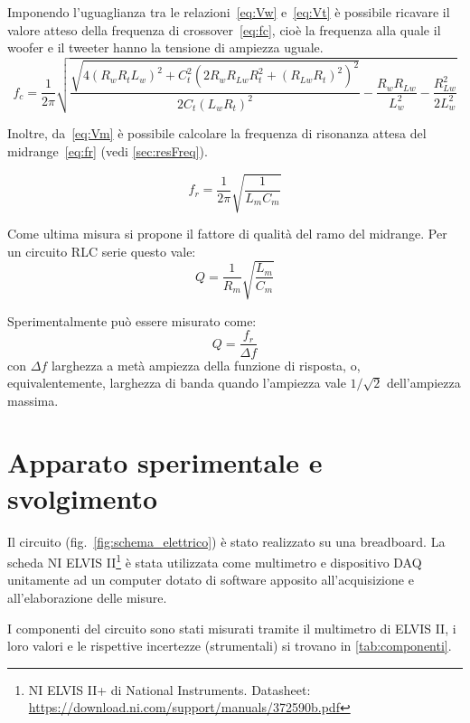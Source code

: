 \documentclass[12pt,italian]{article}
\begin{document}
Imponendo l'uguaglianza tra le relazioni~\eqref{eq:Vw} e~\eqref{eq:Vt} è
possibile ricavare il valore atteso della frequenza di crossover~\eqref{eq:fc},
cioè la frequenza alla quale il woofer e il tweeter hanno la tensione di
ampiezza uguale.
\begin{equation}
	\label{eq:fc}
	f_{c} = \frac{1}{2\pi}\sqrt{\frac{\sqrt{4 {(R_{w} R_{t} L_{w})}^2 + C_{t}^2{(2
	R_{w} R_{Lw} R_{t}^2 + {(R_{Lw} R_{t})}^2)}^2}}{2 C _{t} {(L_{w} R_{t})}^2 } -
	\frac{R_{w} R_{Lw}}{L_{w}^2} - \frac{R_{Lw}^2}{2 L_{w}^2}}
\end{equation}

Inoltre, da~\eqref{eq:Vm} è possibile calcolare la frequenza di risonanza
attesa del midrange~\eqref{eq:fr} (vedi \cref{sec:resFreq}).

\begin{equation}
	\label{eq:fr}
	f_{r} = \frac{1}{2\pi}\sqrt{\frac{1}{L_{m} C_{m}}}  %
\end{equation}

Come ultima misura si propone il fattore di qualità del ramo del midrange. Per un
circuito RLC serie questo vale:
\begin{equation*}
	Q =	\frac{1}{R_m}\sqrt{\frac{L_m}{C_m}}
\end{equation*}

\noindent
Sperimentalmente può essere
misurato come:
\begin{equation*}
	Q = \frac{f_r}{\Delta f}
\end{equation*}
con $\Delta f$ larghezza a metà ampiezza della funzione di risposta, o,
equivalentemente, larghezza di banda quando l'ampiezza vale $1/\sqrt{2}$
dell'ampiezza massima.

\section*{Apparato sperimentale e svolgimento}

Il circuito (fig.~\ref{fig:schema_elettrico}) è stato realizzato su una
breadboard. La scheda NI ELVIS II\footnote{NI ELVIS II+ di National
	Instruments. Datasheet:
	\url{https://download.ni.com/support/manuals/372590b.pdf}} è stata utilizzata
come multimetro e dispositivo DAQ unitamente ad un computer dotato di software
apposito all'acquisizione e all'elaborazione delle misure.

I componenti del circuito sono stati misurati tramite il multimetro di ELVIS
II, i loro valori e le rispettive incertezze (strumentali) si trovano in
\cref{tab:componenti}.
\end{document}
